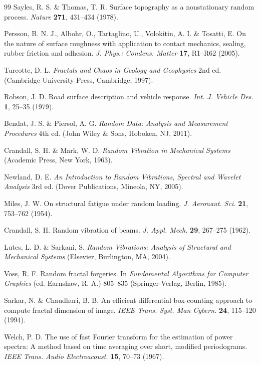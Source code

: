 \documentclass[11pt]{article}
\begin{document}
\begin{thebibliography}{99}
Sayles, R. S. \& Thomas, T. R. Surface topography as a nonstationary random process. \textit{Nature} \textbf{271}, 431--434 (1978).

Persson, B. N. J., Albohr, O., Tartaglino, U., Volokitin, A. I. \& Tosatti, E. On the nature of surface roughness with application to contact mechanics, sealing, rubber friction and adhesion. \textit{J. Phys.: Condens. Matter} \textbf{17}, R1--R62 (2005).

Turcotte, D. L. \textit{Fractals and Chaos in Geology and Geophysics} 2nd ed. (Cambridge University Press, Cambridge, 1997).

Robson, J. D. Road surface description and vehicle response. \textit{Int. J. Vehicle Des.} \textbf{1}, 25--35 (1979).

Bendat, J. S. \& Piersol, A. G. \textit{Random Data: Analysis and Measurement Procedures} 4th ed. (John Wiley \& Sons, Hoboken, NJ, 2011).

Crandall, S. H. \& Mark, W. D. \textit{Random Vibration in Mechanical Systems} (Academic Press, New York, 1963).

Newland, D. E. \textit{An Introduction to Random Vibrations, Spectral and Wavelet Analysis} 3rd ed. (Dover Publications, Mineola, NY, 2005).

Miles, J. W. On structural fatigue under random loading. \textit{J. Aeronaut. Sci.} \textbf{21}, 753--762 (1954).

Crandall, S. H. Random vibration of beams. \textit{J. Appl. Mech.} \textbf{29}, 267--275 (1962).

Lutes, L. D. \& Sarkani, S. \textit{Random Vibrations: Analysis of Structural and Mechanical Systems} (Elsevier, Burlington, MA, 2004).

Voss, R. F. Random fractal forgeries. In \textit{Fundamental Algorithms for Computer Graphics} (ed. Earnshaw, R. A.) 805--835 (Springer-Verlag, Berlin, 1985).

Sarkar, N. \& Chaudhuri, B. B. An efficient differential box-counting approach to compute fractal dimension of image. \textit{IEEE Trans. Syst. Man Cybern.} \textbf{24}, 115--120 (1994).

Welch, P. D. The use of fast Fourier transform for the estimation of power spectra: A method based on time averaging over short, modified periodograms. \textit{IEEE Trans. Audio Electroacoust.} \textbf{15}, 70--73 (1967).


\end{thebibliography}
\end{document}
